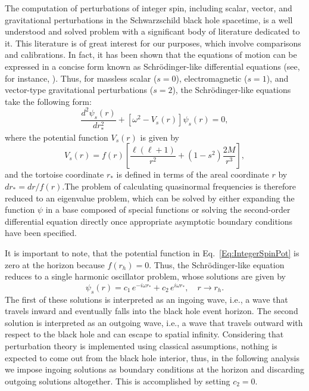 The computation of perturbations of integer spin, including scalar, vector, and gravitational perturbations in the Schwarzschild black hole spacetime, is a well understood and solved problem with a significant body of literature dedicated to it. This literature is of great interest for our purposes, which involve comparisons and calibrations. In fact, it has been shown that the equations of motion can be expressed in a concise form known as Schrödinger-like differential equations (see, for instance, \cite{review3}). Thus, for massless scalar ($s=0$), electromagnetic ($s=1$), and vector-type gravitational perturbations ($s=2$), the Schrödinger-like equations take the following form:
%
\begin{equation}\label{Eq:IntegerSpin}
  \frac{d^2 \psi_{{s}}(r)}{d r_*^2}
  +\left[\omega^2-V_{{s}}(r)\right]\psi_{{s}}(r)=0,
\end{equation}
%
where the potential function $V_{s}(r)$ is given by
%
\begin{equation}\label{Eq:IntegerSpinPot}
  V_{s}(r)=f(r)\left[\frac{\ell\left(\ell+1\right)}{r^2}
    +\left(1-s^2\right)\frac{2M}{r^3}\right],
\end{equation}
%
and the tortoise coordinate $r_*$ is defined in terms of the areal coordinate $r$ by $dr_*=dr/f(r)$.The problem of calculating quasinormal frequencies is therefore reduced to an eigenvalue problem, which can be solved by either expanding the function $\psi$ in a base composed of special functions or solving the second-order differential equation directly once appropriate asymptotic boundary conditions have been specified.

It is important to note, that the potential function in Eq.~\eqref{Eq:IntegerSpinPot} is zero at the horizon because $f(r_h)=0$. Thus, the Schr\"odinger-like equation reduces to a single harmonic oscillator problem, whose solutions are given by
%
\begin{equation} \label{eq:sol1}
  \psi_{s}(r)=c_1\, e^{-i\omega r_*}+c_2\, e^{i\omega r_*}, \quad r\to r_h.
\end{equation}
%
The first of these solutions is interpreted as an ingoing wave, i.e., a wave that travels inward and eventually falls into the black hole event horizon. The second solution is interpreted as an outgoing wave, i.e., a wave that travels outward with respect to the black hole and can escape to spatial infinity. Considering that perturbation theory is implemented using classical assumptions, nothing is expected to come out from the black hole interior, thus, in the following analysis we impose ingoing solutions as boundary conditions at the horizon and discarding outgoing solutions altogether. This is accomplished by setting  $c_2=0$.

